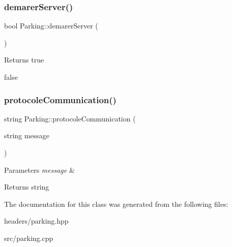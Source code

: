 \subsubsection{\texorpdfstring{demarer\+Server()}{demarerServer()}}
{\footnotesize\ttfamily bool Parking\+::demarer\+Server (\begin{DoxyParamCaption}{ }\end{DoxyParamCaption})}

\begin{DoxyReturn}{Returns}
true 

false 
\end{DoxyReturn}
\mbox{\label{class_parking_a4b02969c773d1f1cbe8b895608124a49}} 
\subsubsection{\texorpdfstring{protocole\+Communication()}{protocoleCommunication()}}
{\footnotesize\ttfamily string Parking\+::protocole\+Communication (\begin{DoxyParamCaption}\item[{string}]{message }\end{DoxyParamCaption})}


\begin{DoxyParams}{Parameters}
{\em message} & \\
\hline
\end{DoxyParams}
\begin{DoxyReturn}{Returns}
string 
\end{DoxyReturn}


The documentation for this class was generated from the following files\+:\begin{DoxyCompactItemize}
\item 
headers/parking.\+hpp\item 
src/parking.\+cpp\end{DoxyCompactItemize}
